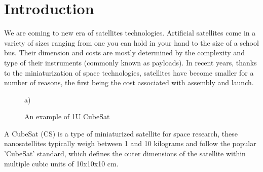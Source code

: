 \chapter{Introduction}




We are coming to new era of satellites technologies.
Artificial satellites come in a variety of sizes ranging from one you can hold in your hand to the size of a school bus. Their dimension and costs are mostly determined by the complexity and type of their instruments (commonly known as payloads). In recent years, thanks to the miniaturization of space technologies, satellites have become smaller for a number of reasons, the first being the cost associated with assembly and launch. %


\begin{minipage}[h]{0.4\linewidth}
\begin{figure}[H]

 a) \\
\caption{An example of 1U CubeSat}
\label{fig:cubesat}
\end{figure}
\end{minipage}
\hfill
\begin{minipage}[h]{0.5\linewidth}
A CubeSat (CS) is a type of miniaturized satellite for space research, these nanosatellites typically weigh between 1 and 10 kilograms and follow the popular 'CubeSat' standard,
which defines the outer dimensions of the satellite within multiple cubic units of 10x10x10 cm.
\end{minipage}
\vspace{1cm}



